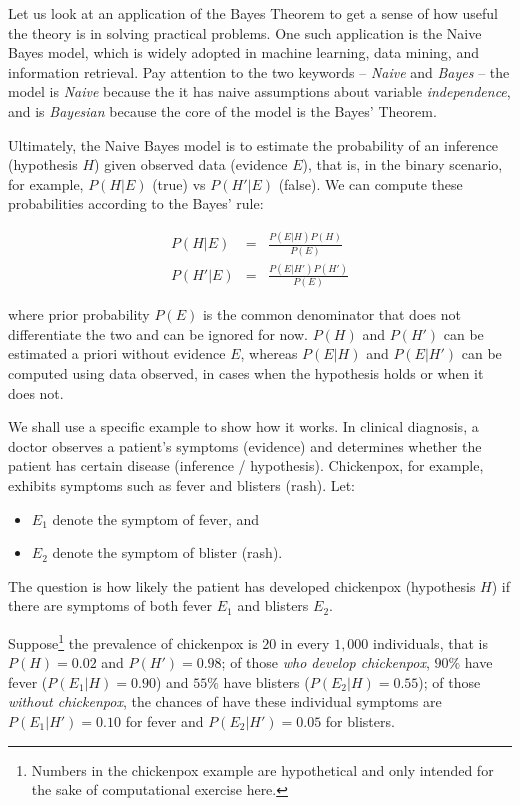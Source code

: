 \documentclass[
  letterpaper,
]{scrbook}
\begin{document}
Let us look at an application of the Bayes Theorem to get a sense of how
useful the theory is in solving practical problems. One such application
is the Naive Bayes model, which is widely adopted in machine learning,
data mining, and information retrieval. Pay attention to the two
keywords -- \emph{Naive} and \emph{Bayes} -- the model is \emph{Naive}
because the it has naive assumptions about variable \emph{independence},
and is \emph{Bayesian} because the core of the model is the Bayes'
Theorem.

Ultimately, the Naive Bayes model is to estimate the probability of an
inference (hypothesis \(H\)) given observed data (evidence \(E\)), that
is, in the binary scenario, for example, \(P(H|E)\) (true) vs
\(P(H'|E)\) (false). We can compute these probabilities according to the
Bayes' rule:

\[\begin{aligned}
P(H|E) & = & \frac{P(E|H) P(H)}{P(E)} \\
P(H'|E) & = & \frac{P(E|H') P(H')}{P(E)}
\end{aligned}\]

where prior probability \(P(E)\) is the common denominator that does not
differentiate the two and can be ignored for now. \(P(H)\) and \(P(H')\)
can be estimated a priori without evidence \(E\), whereas \(P(E|H)\) and
\(P(E|H')\) can be computed using data observed, in cases when the
hypothesis holds or when it does not.

We shall use a specific example to show how it works. In clinical
diagnosis, a doctor observes a patient's symptoms (evidence) and
determines whether the patient has certain disease (inference /
hypothesis). Chickenpox, for example, exhibits symptoms such as fever
and blisters (rash). Let:

\begin{itemize}
\item
  \(E_1\) denote the symptom of fever, and
\item
  \(E_2\) denote the symptom of blister (rash).
\end{itemize}

The question is how likely the patient has developed chickenpox
(hypothesis \(H\)) if there are symptoms of both fever \(E_1\) and
blisters \(E_2\).

Suppose\footnote{Numbers in the chickenpox example are hypothetical and
  only intended for the sake of computational exercise here.} the
prevalence of chickenpox is \(20\) in every \(1,000\) individuals, that
is \(P(H) = 0.02\) and \(P(H')=0.98\); of those \emph{who develop
chickenpox}, \(90\%\) have fever (\(P(E_1|H)=0.90\)) and \(55\%\) have
blisters (\(P(E_2|H)=0.55\)); of those \emph{without chickenpox}, the
chances of have these individual symptoms are \(P(E_1|H')=0.10\) for
fever and \(P(E_2|H')=0.05\) for blisters.
\end{document}
